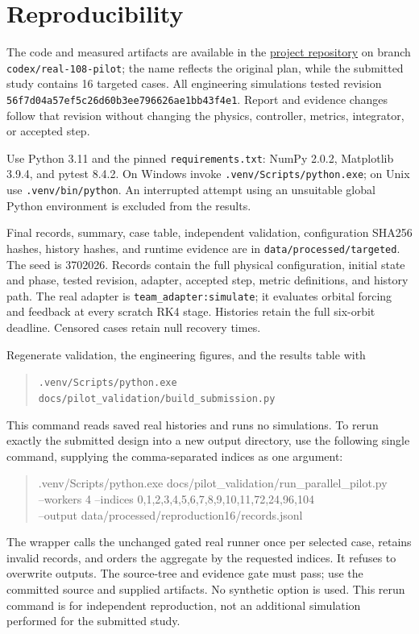 \section{Reproducibility}
The code and measured artifacts are available in the
\href{https://github.com/Yuvraj-Agarwal-101/CubeSat-Detumbling-with-Magnetorquers/tree/codex/real-108-pilot}{project repository}
on branch \texttt{codex/real-108-pilot}; the name reflects the original plan,
while the submitted study contains 16 targeted cases. All engineering
simulations tested revision
\texttt{56f7d04a57ef5c26d60b3ee796626ae1bb43f4e1}.
Report and evidence changes follow that revision without changing the
physics, controller, metrics, integrator, or accepted step.

Use Python 3.11 and the pinned \texttt{requirements.txt}: NumPy 2.0.2,
Matplotlib 3.9.4, and pytest 8.4.2. On Windows invoke
\texttt{.venv/Scripts/python.exe}; on Unix use \texttt{.venv/bin/python}.
An interrupted attempt using an unsuitable global Python environment
is excluded from the results.

Final records, summary, case table, independent validation, configuration
SHA256 hashes, history hashes, and runtime evidence are in
\texttt{data/processed/targeted}. The seed is 3702026. Records contain the
full physical configuration, initial state and phase, tested revision,
adapter, accepted step, metric definitions, and history path.
The real adapter is \texttt{team\_adapter:simulate}; it evaluates orbital
forcing and feedback at every scratch RK4 stage. Histories retain the
full six-orbit deadline. Censored cases retain null recovery times.

Regenerate validation, the engineering figures, and the results table with
\begin{quote}\small
\texttt{.venv/Scripts/python.exe docs/pilot\_validation/build\_submission.py}
\end{quote}
This command reads saved real histories and runs no simulations.
To rerun exactly the submitted design into a new output directory, use
the following single command, supplying the comma-separated indices as
one argument:
\begin{quote}\small\ttfamily
.venv/Scripts/python.exe docs/pilot\_validation/run\_parallel\_pilot.py\\
--workers 4 --indices 0,1,2,3,4,5,6,7,8,9,10,11,72,24,96,104\\
--output data/processed/reproduction16/records.jsonl
\end{quote}
The wrapper calls the unchanged gated real runner once per selected case,
retains invalid records, and orders the aggregate by the requested indices.
It refuses to overwrite outputs. The source-tree and evidence gate must
pass; use the committed source and supplied artifacts. No synthetic option
is used. This rerun command is for independent reproduction, not an
additional simulation performed for the submitted study.

